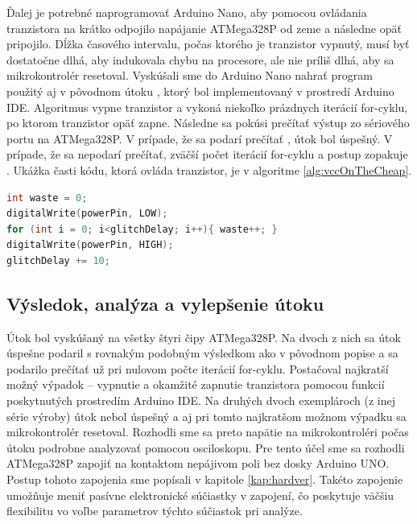 Ďalej je potrebné naprogramovať Arduino Nano, aby pomocou ovládania tranzistora na krátko odpojilo napájanie ATMega328P od zeme a následne opäť pripojilo. Dĺžka časového intervalu, počas ktorého je tranzistor vypnutý, musí byť dostatočne dlhá, aby indukovala chybu na procesore, ale nie príliš dlhá, aby sa mikrokontrolér resetoval. Vyskúšali sme do Arduino Nano nahrať program použitý aj v pôvodnom útoku \cite{vccOnTheCheap}, ktorý bol implementovaný v prostredí Arduino IDE. Algoritmus vypne tranzistor a vykoná niekoľko prázdnych iterácií for-cyklu, po ktorom tranzistor opäť zapne. Následne sa pokúsi prečítať výstup zo sériového portu na ATMega328P. V prípade, že sa podarí prečítať , útok bol úspešný. V prípade, že sa  nepodarí prečítať, zväčší počet iterácií for-cyklu a postup zopakuje \cite{vccOnTheCheap}. Ukážka časti kódu, ktorá ovláda tranzistor, je v algoritme \ref{alg:vccOnTheCheap}.

\begin{lstlisting}[float,language=C,caption={Ovládanie tranzistora, ktorý spína napájanie na ATMega328P. Prevzaté zo zdrojového kódu pôvodného útoku \cite{vccOnTheCheap}.},label=alg:vccOnTheCheap]
int waste = 0;
digitalWrite(powerPin, LOW);
for (int i = 0; i<glitchDelay; i++){ waste++; }                    
digitalWrite(powerPin, HIGH);
glitchDelay += 10;
\end{lstlisting}

\subsection{Výsledok, analýza a vylepšenie útoku}
Útok bol vyskúšaný na všetky štyri čipy ATMega328P. Na dvoch z nich sa útok úspešne podaril s rovnakým podobným výsledkom ako v pôvodnom popise \cite{vccOnTheCheap} a  sa podarilo prečítať už pri nulovom počte iterácií for-cyklu. Postačoval najkratší možný výpadok -- vypnutie a okamžité zapnutie tranzistora pomocou funkcií poskytnutých prostredím Arduino IDE. Na druhých dvoch exemplároch (z inej série výroby) útok nebol úspešný a aj pri tomto najkratšom možnom výpadku sa mikrokontrolér resetoval. Rozhodli sme sa preto napätie na mikrokontroléri počas útoku podrobne analyzovať pomocou osciloskopu. Pre tento účel sme sa rozhodli ATMega328P zapojiť na kontaktom nepájivom poli bez dosky Arduino UNO. Postup tohoto zapojenia sme popísali v kapitole \ref{kap:hardver}. Takéto zapojenie umožňuje meniť pasívne elektronické súčiastky v zapojení, čo poskytuje väčšiu flexibilitu vo voľbe parametrov týchto súčiastok pri analýze.


